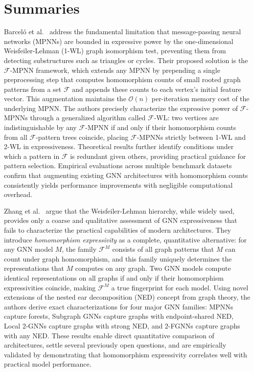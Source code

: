 \documentclass[12pt]{article}
\begin{document}
\section{Summaries}

Barcel\'{o} et al.~\cite{barcelo2021graph} address the fundamental limitation that
message-passing neural networks (MPNNs) are bounded in expressive power by the
one-dimensional Weisfeiler-Lehman (1-WL) graph isomorphism test, preventing
them from detecting substructures such as triangles or cycles. Their proposed
solution is the $\mathcal{F}$-MPNN framework, which extends any MPNN by
prepending a single preprocessing step that computes homomorphism counts of small
rooted graph patterns from a set $\mathcal{F}$ and appends these counts to each
vertex's initial feature vector. This augmentation maintains the $\mathcal{O}(n)$
per-iteration memory cost of the underlying MPNN. The authors precisely
characterize the expressive power of $\mathcal{F}$-MPNNs through a generalized
algorithm called $\mathcal{F}$-WL: two vertices are indistinguishable by any
$\mathcal{F}$-MPNN if and only if their homomorphism counts from all
$\mathcal{F}$-pattern trees coincide, placing $\mathcal{F}$-MPNNs strictly
between 1-WL and 2-WL in expressiveness. Theoretical results further identify
conditions under which a pattern in $\mathcal{F}$ is redundant given others,
providing practical guidance for pattern selection. Empirical evaluations across
multiple benchmark datasets confirm that augmenting existing GNN architectures
with homomorphism counts consistently yields performance improvements with
negligible computational overhead.

Zhang et al.~\cite{zhang2024beyond} argue that the Weisfeiler-Lehman hierarchy, while
widely used, provides only a coarse and qualitative assessment of GNN
expressiveness that fails to characterize the practical capabilities of modern
architectures. They introduce \textit{homomorphism expressivity} as a complete,
quantitative alternative: for any GNN model $M$, the family $\mathcal{F}^M$
consists of all graph patterns that $M$ can count under graph homomorphism, and
this family uniquely determines the representations that $M$ computes on any
graph. Two GNN models compute identical representations on all graphs if and only
if their homomorphism expressivities coincide, making $\mathcal{F}^M$ a true
fingerprint for each model. Using novel extensions of the nested ear decomposition
(NED) concept from graph theory, the authors derive exact characterizations for
four major GNN families: MPNNs capture forests, Subgraph GNNs capture graphs with
endpoint-shared NED, Local 2-GNNs capture graphs with strong NED, and 2-FGNNs
capture graphs with any NED. These results enable direct quantitative comparison
of architectures, settle several previously open questions, and are empirically
validated by demonstrating that homomorphism expressivity correlates well with
practical model performance.
\end{document}
